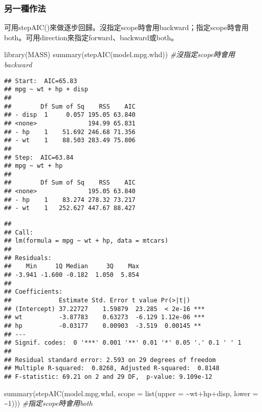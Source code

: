 \documentclass[
]{book}
\newenvironment{Shaded}{\begin{snugshade}}{\end{snugshade}}
\newcommand{\AttributeTok}[1]{\textcolor[rgb]{0.77,0.63,0.00}{#1}}
\newcommand{\CommentTok}[1]{\textcolor[rgb]{0.56,0.35,0.01}{\textit{#1}}}
\newcommand{\DecValTok}[1]{\textcolor[rgb]{0.00,0.00,0.81}{#1}}
\newcommand{\FunctionTok}[1]{\textcolor[rgb]{0.00,0.00,0.00}{#1}}
\newcommand{\NormalTok}[1]{#1}
\newcommand{\SpecialCharTok}[1]{\textcolor[rgb]{0.00,0.00,0.00}{#1}}
\begin{document}
\hypertarget{ux53e6ux4e00ux7a2eux4f5cux6cd5}{%
\subsubsection{另一種作法}\label{ux53e6ux4e00ux7a2eux4f5cux6cd5}}

可用stepAIC()來做逐步回歸。沒指定scope時會用backward；指定scope時會用both。可用direction來指定forward、backward或both。

\begin{Shaded}
\begin{Highlighting}[]
\FunctionTok{library}\NormalTok{(MASS)}
\FunctionTok{summary}\NormalTok{(}\FunctionTok{stepAIC}\NormalTok{(model.mpg.whd)) }\CommentTok{\#沒指定scope時會用backward}
\end{Highlighting}
\end{Shaded}

\begin{verbatim}
## Start:  AIC=65.83
## mpg ~ wt + hp + disp
## 
##        Df Sum of Sq    RSS    AIC
## - disp  1     0.057 195.05 63.840
## <none>              194.99 65.831
## - hp    1    51.692 246.68 71.356
## - wt    1    88.503 283.49 75.806
## 
## Step:  AIC=63.84
## mpg ~ wt + hp
## 
##        Df Sum of Sq    RSS    AIC
## <none>              195.05 63.840
## - hp    1    83.274 278.32 73.217
## - wt    1   252.627 447.67 88.427
\end{verbatim}

\begin{verbatim}
## 
## Call:
## lm(formula = mpg ~ wt + hp, data = mtcars)
## 
## Residuals:
##    Min     1Q Median     3Q    Max 
## -3.941 -1.600 -0.182  1.050  5.854 
## 
## Coefficients:
##             Estimate Std. Error t value Pr(>|t|)    
## (Intercept) 37.22727    1.59879  23.285  < 2e-16 ***
## wt          -3.87783    0.63273  -6.129 1.12e-06 ***
## hp          -0.03177    0.00903  -3.519  0.00145 ** 
## ---
## Signif. codes:  0 '***' 0.001 '**' 0.01 '*' 0.05 '.' 0.1 ' ' 1
## 
## Residual standard error: 2.593 on 29 degrees of freedom
## Multiple R-squared:  0.8268, Adjusted R-squared:  0.8148 
## F-statistic: 69.21 on 2 and 29 DF,  p-value: 9.109e-12
\end{verbatim}

\begin{Shaded}
\begin{Highlighting}[]
\FunctionTok{summary}\NormalTok{(}\FunctionTok{stepAIC}\NormalTok{(model.mpg.whd, }\AttributeTok{scope =} \FunctionTok{list}\NormalTok{(}\AttributeTok{upper =} \SpecialCharTok{\textasciitilde{}}\NormalTok{wt}\SpecialCharTok{+}\NormalTok{hp}\SpecialCharTok{+}\NormalTok{disp, }\AttributeTok{lower =} \SpecialCharTok{\textasciitilde{}}\DecValTok{1}\NormalTok{)))  }\CommentTok{\#指定scope時會用both}
\end{Highlighting}
\end{Shaded}
\end{document}
